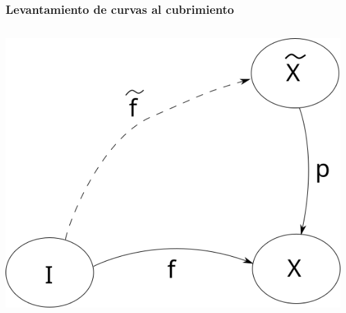 \documentclass[xetex,mathserif,serif]{beamer}
\begin{document}
  \begin{frame}
    \frametitle{Levantamiento de curvas al cubrimiento}
    \begin{columns}
      \begin{column}{.5\textwidth}
        \centering
        \includegraphics[scale=0.3]{../tesis/imagenes/lifting-path.png}
      \end{column}
    \begin{column}{.5\textwidth}

    \end{column}
    \end{columns}
  \end{frame}
\end{document}
